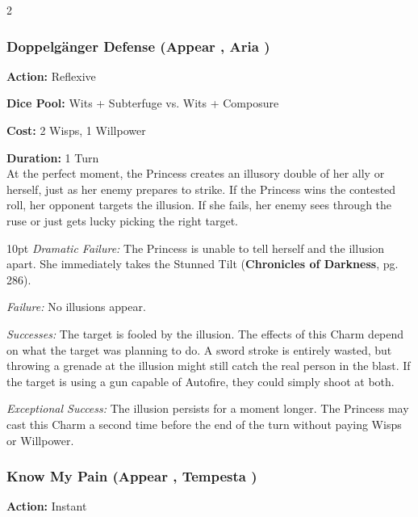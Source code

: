 \begin{multicols}{2}
\subsubsection*{Doppelgänger Defense (Appear \textbullet\textbullet\textbullet, Aria \textbullet\textbullet\textbullet)}
\noindent \textbf{Action:} Reflexive

\noindent \textbf{Dice Pool:} Wits + Subterfuge vs. Wits + Composure

\noindent \textbf{Cost:} 2 Wisps, 1 Willpower

\noindent \textbf{Duration:} 1 Turn\\

\noindent At the perfect moment, the Princess creates an illusory double of her ally or herself, just as her enemy prepares to strike. If the Princess wins the contested roll, her opponent targets the illusion. If she fails, her enemy sees through the ruse or just gets lucky picking the right target.

\begin{myindentpar}{10pt}     \emph{Dramatic Failure:} The Princess is unable to tell herself and the illusion apart. She immediately takes the Stunned Tilt (\textbf{Chronicles of Darkness}, pg. 286).

    \emph{Failure:} No illusions appear.

    \emph{Successes:}  The target is fooled by the illusion. The effects of this Charm depend on what the target was planning to do. A sword stroke is entirely wasted, but throwing a grenade at the illusion might still catch the real person in the blast. If the target is using a gun capable of Autofire, they could simply shoot at both.

    \emph{Exceptional Success:} The illusion persists for a moment longer. The Princess may cast this Charm a second time before the end of the turn without paying Wisps or Willpower. \end{myindentpar}




\subsubsection*{Know My Pain (Appear \textbullet\textbullet\textbullet, Tempesta \textbullet\textbullet)}
\noindent \textbf{Action:} Instant


\end{multicols}
